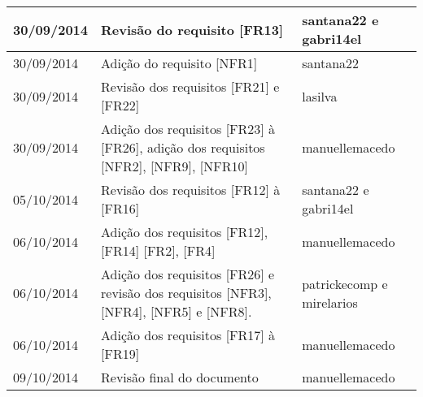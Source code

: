\documentclass{article}
\begin{document}
\begin{table}[ht]
\begin{tabular}[pos]{|m{2cm} | m{7.2cm} | m{3.8cm}|}
\small 30/09/2014 & \small Revisão do requisito [FR13] & \small santana22 e gabri14el \\ \hline

\small 30/09/2014 & \small Adição do requisito [NFR1] & \small santana22 \\ \hline

\small 30/09/2014 & \small Revisão dos requisitos [FR21] e [FR22] & \small lasilva\\ \hline

\small 30/09/2014 & \small Adição dos requisitos [FR23] à [FR26], adição dos requisitos [NFR2], [NFR9], [NFR10]  & \small manuellemacedo \\ \hline

\small 05/10/2014 & \small Revisão dos requisitos [FR12] à [FR16] & \small santana22 e gabri14el \\ \hline

\small 06/10/2014 & \small Adição dos requisitos [FR12], [FR14] [FR2], [FR4] & \small manuellemacedo \\ \hline %

\small 06/10/2014 & \small Adição dos requisitos [FR26] e revisão dos requisitos [NFR3], [NFR4], [NFR5] e [NFR8].  & \small patrickecomp e mirelarios \\ \hline

\small 06/10/2014 & \small Adição dos requisitos [FR17] à [FR19] & \small manuellemacedo \\ \hline %

\small 09/10/2014 & \small Revisão final do documento & \small manuellemacedo \\ \hline

		\end{tabular}
	\end{table}
\newpage
\end{document}

